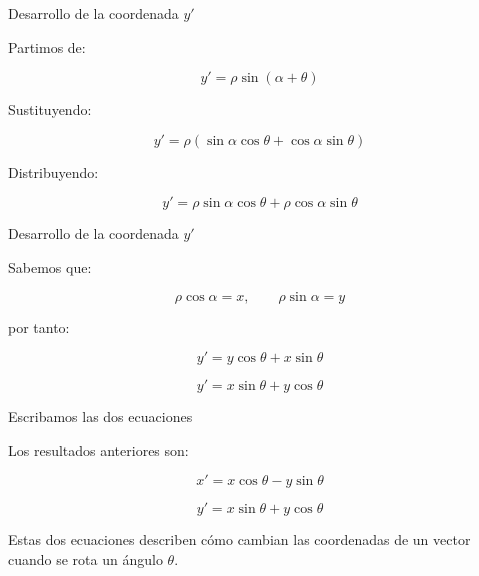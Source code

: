 \documentclass[aspectratio=169]{beamer}
\begin{document}
\begin{frame}{Desarrollo de la coordenada \texorpdfstring{$y'$}{y'}}

    Partimos de:

    \[
    y'=\rho\sin(\alpha+\theta)
    \]

    Sustituyendo:

    \[
    y'
    =
    \rho
    \left(
    \sin\alpha\cos\theta
    +
    \cos\alpha\sin\theta
    \right)
    \]

    Distribuyendo:

    \[
    y'
    =
    \rho\sin\alpha\cos\theta
    +
    \rho\cos\alpha\sin\theta
    \]

\end{frame}

\begin{frame}{Desarrollo de la coordenada \texorpdfstring{$y'$}{y'}}

    Sabemos que:

    \[
    \rho\cos\alpha=x,
    \qquad
    \rho\sin\alpha=y
    \]

    por tanto:

    \[
    y'
    =
    y\cos\theta
    +
    x\sin\theta
    \]

    \[
    \boxed{
        y'=x\sin\theta+y\cos\theta
    }
    \]

\end{frame}

\begin{frame}{Escribamos las dos ecuaciones}

    Los resultados anteriores son:

    \[
    x'
    =
    x\cos\theta-y\sin\theta
    \]

    \[
    y'
    =
    x\sin\theta+y\cos\theta
    \]

    \vspace{0.3cm}

    Estas dos ecuaciones describen cómo cambian las coordenadas de un vector
    cuando se rota un ángulo $\theta$.

\end{frame}
\end{document}
